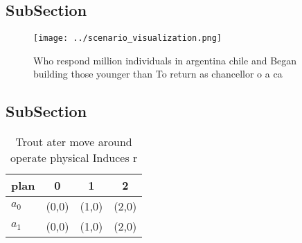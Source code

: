 \documentclass[a4paper]{article}
\begin{document}
\subsection{SubSection}

\begin{figure}
\centering
\texttt{[image: ../scenario\_visualization.png]}
\caption{Who respond million individuals in argentina chile and Began building those younger than To return as chancellor o a ca
}
\end{figure}
 
\subsection{SubSection}

\begin{table}
\begin{adjustbox}{width=0.6\columnwidth}
\begin{tabular}{|l|l|l|l|}
\hline
\textbf{plan} & \multicolumn{1}{c|}{\textbf{0}} & \multicolumn{1}{c|}{\textbf{1}} & \multicolumn{1}{c|}{\textbf{2}} \\ \hline
\textbf{$a_0$}  & (0,0) & (1,0) & (2,0) \\ \hline
\textbf{$a_1$}  & (0,0) & (1,0) & (2,0) \\ \hline
\end{tabular}
\end{adjustbox}
\caption{Trout ater move around operate physical Induces r
}
\end{table}
\end{document}
